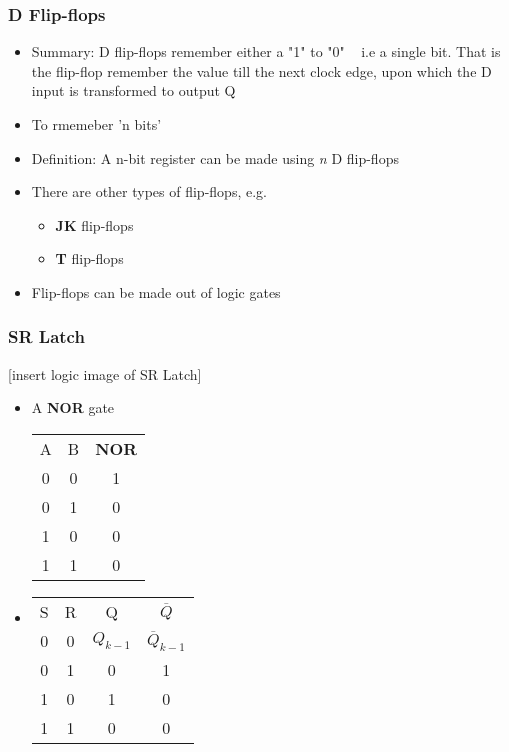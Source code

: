 \documentclass{article}
\begin{document}
\subsubsection{D Flip-flops}
\begin{itemize}
\item Summary: D flip-flops remember either a "1" to "0" ~ i.e a single bit. That is the flip-flop remember the value till the next clock edge, upon which the D input is transformed to output Q
\item To rmemeber 'n bits'
\item Definition: A n-bit register can be made using \textit{n} D flip-flops
\item There are other types of flip-flops, e.g.
\begin{itemize}
\item \textbf{JK} flip-flops
\item \textbf{T} flip-flops
\end{itemize}
\item Flip-flops can be made out of logic gates
\end{itemize}

\subsubsection{SR Latch}

[insert logic image of SR Latch]

\begin{itemize}
\item A \textbf{NOR} gate
\begin{tabular}{ c c c }
A & B & \textbf{NOR} \\
0 & 0 & 1 \\
0 & 1 & 0 \\
1 & 0 & 0 \\
1 & 1 & 0 \\
\end{tabular}
\item 
\begin{tabular} { c c c c }
S & R & Q & $\overline{Q}$ \\
0 & 0 & $Q_{k-1}$ & $\overline{Q}_{k-1}$ \\
0 & 1 & 0 & 1 \\
1 & 0 & 1 & 0 \\
1 & 1 & 0 & 0 \\
\end{tabular}
\end{itemize}
\end{document}
